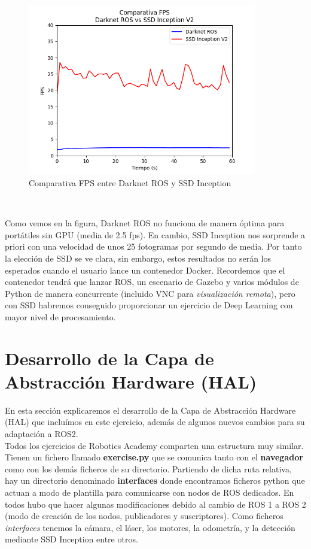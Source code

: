 \begin{figure} [H]
  \begin{center}
    \includegraphics[width=10cm]{imagenes/comparativa-fps-models.png}
  \end{center}
  \caption[Comparativa FPS entre Darknet ROS y SSD Inception]{Comparativa FPS entre Darknet ROS y SSD Inception}
  \label{fig:comparativa_fps_models}
\end{figure}\

Como vemos en la figura, Darknet ROS no funciona de manera óptima para portátiles sin GPU (media de 2.5 fps). En cambio, SSD Inception nos sorprende a priori con una velocidad de unos 25 fotogramas por segundo de media. Por tanto la elección de SSD se ve clara, sin embargo, estos resultados no serán los esperados cuando el usuario lance un contenedor Docker. Recordemos que el contenedor tendrá que lanzar ROS, un escenario de Gazebo y varios módulos de Python de manera concurrente (incluido VNC para \textit{visualización remota}), pero con SSD habremos conseguido proporcionar un ejercicio de Deep Learning con mayor nivel de procesamiento.\\




\section{Desarrollo de la Capa de Abstracción Hardware (HAL)}
\label{sec:turtlebot2_hal_simulado}

En esta sección explicaremos el desarrollo de la Capa de Abstracción Hardware (HAL) que incluímos en este ejercicio, además de algunos nuevos cambios para su adaptación a ROS2.\\

Todos los ejercicios de Robotics Academy comparten una estructura muy similar. Tienen un fichero llamado \textbf{exercise.py} que se comunica tanto con el \textbf{navegador} como con los demás ficheros de su directorio. Partiendo de dicha ruta relativa, hay un directorio denominado \textbf{interfaces} donde encontramos ficheros python que actuan a modo de plantilla para comunicarse con nodos de ROS dedicados. En todos hubo que hacer algunas modificaciones debido al cambio de ROS 1 a ROS 2 (modo de creación de los nodos, publicadores y suscriptores). Como ficheros \textit{interfaces} tenemos la cámara, el láser, los motores, la odometría, y la detección mediante SSD Inception entre otros.\\

